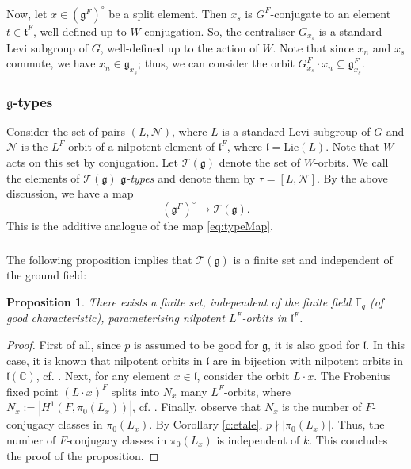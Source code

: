 \documentclass[12pt]{amsart}
\theoremstyle{plain}
\newtheorem{prop}[thm]{Proposition}
\theoremstyle{definition}
\theoremstyle{remark}
\newcommand{\ra}{\rightarrow}
\newcommand{\bC}{\mathbb{C}}
\newcommand{\cT}{\mathcal{T}}
\newcommand{\cN}{\mathcal{N}}
\newcommand{\fg}{\mathfrak{g}}
\newcommand{\ft}{\mathfrak{t}}
\newcommand{\fl}{\mathfrak{l}}
\begin{document}
\subsubsection{} Now, let $x\in (\fg^F)^\circ$ be a split element. Then  $x_s$ is $G^F$-conjugate to an element $t\in \ft^F$, well-defined up to $W$-conjugation. So, the centraliser $G_{x_s}$ is a standard Levi subgroup of $G$, well-defined up to the action of $W$. Note that since $x_n$ and $x_s$ commute, we have $x_n\in \fg_{x_s}$; thus, we can consider the orbit $G_{x_s}^F\cdot x_n\subseteq \fg_{x_s}^F$. 
 
 
\subsubsection{$\fg$-types}\label{sss:fgtypes}
Consider the set of pairs $(L,\cN)$, where $L$ is a standard Levi subgroup of $G$ and $\cN$ is the $L^F$-orbit of a nilpotent element of $\fl^F$, where $\fl=\mathrm{Lie}(L)$. Note that $W$ acts on this set by conjugation. Let $\cT(\fg)$ denote the set of $W$-orbits. We call the elements of $\cT(\fg)$ \emph{$\fg$-types} and denote them by $\tau=[L,\cN]$. By the above discussion, we have a map 
\[
(\fg^F)^\circ\ra \cT(\fg).
\]
This is the additive analogue of the map \eqref{eq:typeMap}. 
\subsubsection{} 
 The following proposition implies that $\cT(\fg)$ is a finite set and independent of the ground field: 
 
\begin{prop}There exists a finite set, independent of the finite field $\mathbb{F}_q$ (of good characteristic), parameterising nilpotent $L^F$-orbits in $\fl^F$. 
\end{prop} 

\begin{proof} First of all, since $p$ is assumed to be good for $\fg$, it is also good for $\fl$. In this case,  it is known that nilpotent orbits in $\fl$ are in bijection with nilpotent orbits in $\fl(\bC)$, cf. \cite{Premet03}. Next, for any element $x\in \fl$, consider the orbit $L\cdot x$. The Frobenius fixed point $(L\cdot x)^F$ splits into $N_x$ many $L^F$-orbits, where $N_x:=|H^1(F,\pi_0(L_x))|$, cf. \cite[Proposition 4.2.14]{DM20}. Finally, observe that $N_x$ is the number of $F$-conjugacy classes in $\pi_0(L_x)$. By Corollary \ref{c:etale}, $p\nmid |\pi_0(L_x)|$. Thus, the number of $F$-conjugacy classes in $\pi_0(L_x)$ is independent of $k$. This concludes the proof of the proposition. 
\end{proof} 
\end{document}
